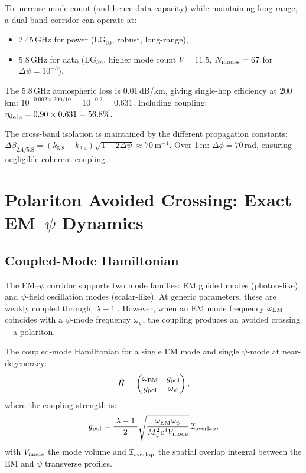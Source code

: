 \documentclass[aps,prd,twocolumn,superscriptaddress]{revtex4-2}
\newcommand{\LG}{\mathrm{LG}}
\begin{document}
To increase mode count (and hence data capacity) while maintaining
long range, a dual-band corridor can operate at:
\begin{itemize}
\item 2.45\,GHz for power ($\LG_{00}$, robust, long-range),
\item 5.8\,GHz for data ($\LG_{lm}$, higher mode count $V = 11.5$,
$N_{\rm modes} = 67$ for $\Delta\psi = 10^{-3}$).
\end{itemize}
The 5.8\,GHz atmospheric loss is 0.01\,dB/km, giving single-hop
efficiency at 200\,km: $10^{-0.002\times200/10} = 10^{-0.2} = 0.631$.
Including coupling: $\eta_{\rm data} = 0.90\times0.631 = 56.8\%$.

The cross-band isolation is maintained by the different propagation
constants: $\Delta\beta_{2.4/5.8} = (k_{5.8} - k_{2.4})\sqrt{1-2\Delta\psi}
\approx 70\,\text{m}^{-1}$.  Over 1\,m: $\Delta\phi = 70$\,rad,
ensuring negligible coherent coupling.


\section{Polariton Avoided Crossing: Exact EM--$\psi$ Dynamics}
\label{sec:polariton}

\subsection{Coupled-Mode Hamiltonian}

The EM--$\psi$ corridor supports two mode families: EM guided modes
(photon-like) and $\psi$-field oscillation modes (scalar-like).
At generic parameters, these are weakly coupled through
$|\lambda - 1|$. However, when an EM mode frequency $\omega_{\rm EM}$
coincides with a $\psi$-mode frequency $\omega_\psi$, the coupling
produces an avoided crossing---a polariton.

The coupled-mode Hamiltonian for a single EM mode and single
$\psi$-mode at near-degeneracy:
\begin{equation}
\hat{H} = \begin{pmatrix}
\omega_{\rm EM} & g_{\rm pol} \\
g_{\rm pol} & \omega_\psi
\end{pmatrix},
\label{eq:polariton-H}
\end{equation}
where the coupling strength is:
\begin{equation}
g_{\rm pol} = \frac{|\lambda-1|}{2}\sqrt{\frac{\omega_{\rm EM}\omega_\psi}
{M_\psi^2 c^4 V_{\rm mode}}}\,\mathcal{I}_{\rm overlap},
\label{eq:g-pol}
\end{equation}
with $V_{\rm mode}$ the mode volume and $\mathcal{I}_{\rm overlap}$
the spatial overlap integral between the EM and $\psi$ transverse
profiles.
\end{document}
